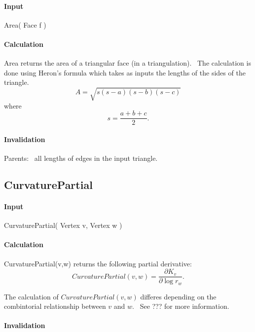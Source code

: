 \paragraph{Input}

Area( Face f )

\paragraph{Calculation}

Area returns the area of a triangular face (in a triangulation). \ The
calculation is done using Heron's formula which takes as inputs the lengths
of the sides of the triangle.%
\begin{equation*}
A=\sqrt{s\left( s-a\right) \left( s-b\right) \left( s-c\right) }
\end{equation*}%
where%
\begin{equation*}
s=\frac{a+b+c}{2}.
\end{equation*}

\paragraph{Invalidation}

Parents: \ all lengths of edges in the input triangle.

\subsection{CurvaturePartial}

\paragraph{Input}

CurvaturePartial( Vertex v, Vertex w )

\paragraph{Calculation}

CurvaturePartial(v,w) returns the following partial derivative:%
\begin{equation*}
CurvaturePartial(v,w)=\frac{\partial K_{v}}{\partial \log r_{w}}.
\end{equation*}

The calculation of $CurvaturePartial(v,w)$ differes depending on the
combintorial relationship between $v$ and $w$. \ See ??? for more
information.

\paragraph{Invalidation}

